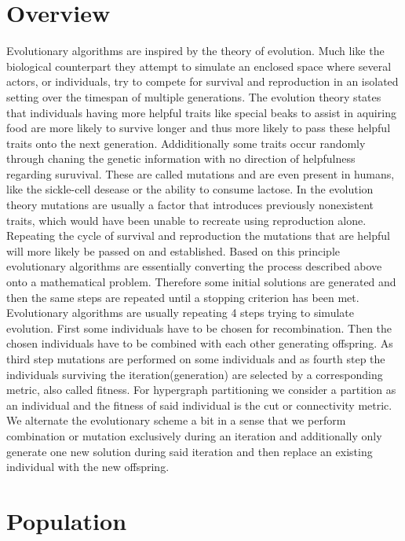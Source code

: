 \documentclass[a4paper,12pt,bibtotoc,titlepage, liststotoc,BCOR7mm,headsepline,pointlessnumbers]{scrbook}
\numberwithin{equation}{section}
\begin{document}
\section{Overview}
Evolutionary algorithms are inspired by the theory of evolution. Much like the biological counterpart they attempt to simulate 
an enclosed space where several actors, or individuals, try to compete for survival and reproduction in an isolated setting over the timespan of multiple generations.
The evolution theory states that individuals having more helpful traits like special beaks to assist in aquiring food are more likely to survive longer and 
thus more likely to pass these helpful traits onto the next generation. Addiditionally some traits occur randomly through chaning the genetic information with no direction of helpfulness regarding suruvival. These are called mutations and are even present in humans, like the sickle-cell desease or the ability to consume lactose. In the evolution theory mutations 
are usually a factor that introduces previously nonexistent traits, which would have been unable to recreate using reproduction alone. Repeating the cycle of survival and reproduction the mutations that are helpful will more likely be passed on and established. Based on this principle evolutionary algorithms are essentially converting the process described above onto a mathematical problem. Therefore some initial solutions are generated and then the same steps are repeated until a stopping criterion has been met.
Evolutionary algorithms are usually repeating 4 steps trying to simulate evolution. First some individuals have to be chosen for recombination. Then the chosen individuals have to be combined with each other generating offspring. As third step mutations are performed on some individuals and as fourth step the individuals surviving the iteration(generation) are selected by a corresponding metric, also called fitness. For hypergraph partitioning we consider a partition as an individual and the fitness of said individual is the cut or connectivity metric. We alternate the evolutionary scheme a bit in a sense that we perform combination or mutation exclusively during an iteration and additionally only generate one new solution during said iteration and then replace an existing individual with the new offspring. 

\section{Population}
\end{document}
